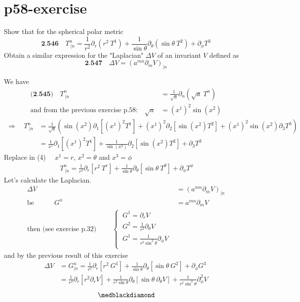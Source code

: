 \section{p58-exercise}
\begin{tcolorbox}
Show that for the spherical polar metric 
$$\textbf{2.546}\quad T^n_{\ |n} = \frac{1}{r^2}\partial_r(r^2 \ T^1) + \frac{1}{\sin \theta }\partial_{\theta}(\sin \theta\  T^2) + \partial_{\phi}T^3 $$
Obtain a similar expression for the "Laplacian" $\Delta V$ of an invariant $V$ defined as $$\textbf{2.547}\quad\Delta V = \left( a^{mn}\partial_m V\right)_{|n}$$
\end{tcolorbox}
We have
\begin{align}
\textbf{(2.545)}\quad T^n_{\ |n} &= \frac{1}{\sqrt{a}}\partial_n(\sqrt{a} \ T^n)\\
\text{and from the previous exercise p.58:}\quad \sqrt{a} &= (x^1)^2\sin(x^2)
\end{align}
\begin{align}
\Rightarrow \quad T^n_{\ |n} &= \frac{1}{\sqrt{a}}\left(\sin(x^2) \partial_1[(x^1)^2 T^1]  + (x^1)^2\partial_2 [ \sin (x^2)T^2] + (x^1)^2 \sin (x^2)\partial_3 T^3 \right)\\
&= \frac{1}{x^1} \partial_1[(x^1)^2 T^1]  + \frac{1}{\sin (x^2)}\partial_2 [ \sin (x^2)T^2] + \partial_3 T^3 
\end{align}
Replace in (4) $\quad x^1 =r$, $x^2 =  \theta$ and $x^3 = \phi$
\begin{align}
\ T^n_{\ |n} = \frac{1}{r^2} \partial_r [r^2 \ T^r]  + \frac{1}{\sin \theta}\partial_{\theta} [ \sin \theta \ T^{\theta}] + \partial_{\phi} T^{\phi} 
\end{align}
Let's calculate the Laplacian.
\begin{align}
\Delta V &= \left( a^{mn}\partial_m V\right)_{|n}\\
\text{be}\quad \quad \quad G^n &= a^{mn}\partial_m V\\
\text{then (see exercise p.32) } \quad \quad \left\{ \begin{array}{c}
\ G^1 = \partial_r V\\
\ G^2 = \frac{1}{r^2}\partial_{\theta} V\\
\ G^1 = \frac{1}{r^2 \sin ^2 \theta}\partial_{\phi} V\\
\end{array}\right.
\end{align}
and by the previous result of this exercise
\begin{align}
\Delta V &= G^n_{|n} = \frac{1}{r^2} \partial_r [r^2 \ G^1]  + \frac{1}{\sin \theta}\partial_{\theta} [ \sin \theta \ G^{2}] + \partial_{\phi} G^{3} \\
\ &= \frac{1}{r^2} \partial_r [r^2 \partial_r V]  + \frac{1}{r^2 \sin \theta}\partial_{\theta} [ \sin \theta \ \partial_{\theta} V] + \frac{1}{r^2 \sin ^2 \theta}\partial^2_{\phi} V
\end{align}
$$\medblackdiamond$$
\newpage

